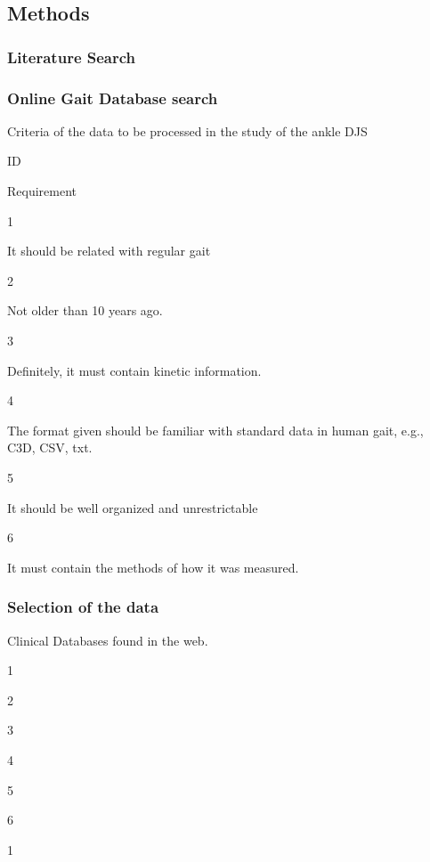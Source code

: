 \documentclass[11pt]{article}
\begin{document}
    \hypertarget{methods}{%
\subsection{Methods}\label{methods}}

    \hypertarget{literature-search}{%
\subsubsection{Literature Search}\label{literature-search}}

    \hypertarget{online-gait-database-search}{%
\subsubsection{Online Gait Database
search}\label{online-gait-database-search}}

Criteria of the data to be processed in the study of the ankle DJS{}

ID

Requirement

1

It should be related with regular gait

2

Not older than 10 years ago.

3

Definitely, it must contain kinetic information.

4

The format given should be familiar with standard data in human gait,
e.g., C3D, CSV, txt.

5

It should be well organized and unrestrictable

6

It must contain the methods of how it was measured.

    \hypertarget{selection-of-the-data}{%
\subsubsection{Selection of the data}\label{selection-of-the-data}}

Clinical Databases found in the web.

1

2

3

4

5

6

1
\end{document}
